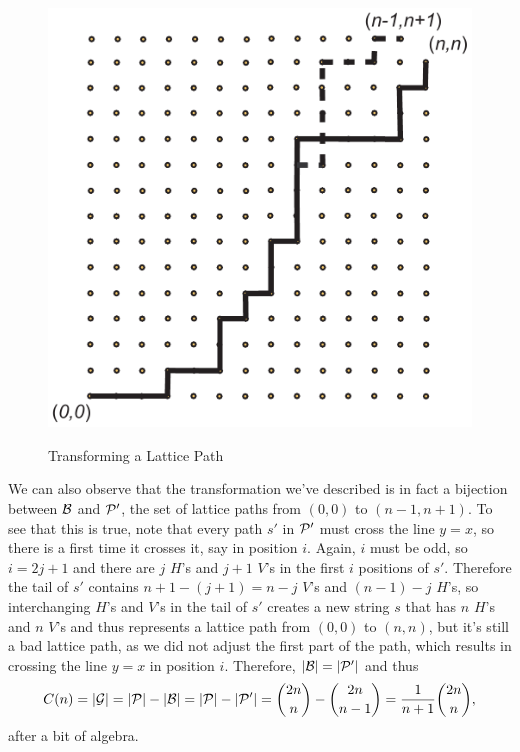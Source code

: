 \begin{example}
\begin{figure}
\begin{center}
\includegraphics[scale=.4]{string-figs/3012-fig26}\\
\caption{Transforming a Lattice Path}
\label{flippath}
\end{center}
\end{figure}

We can also observe that the transformation we've described is in fact
a bijection between $\mathcal{B}$ and $\mathcal{P}'$, the set of lattice paths from
$(0,0)$ to $(n-1,n+1)$. To see that this is true, note that every path
$s'$ in $\mathcal{P}'$ must cross the line $y=x$, so there is a first time it
crosses it, say in position $i$. Again, $i$ must be odd, so $i=2j+1$
and there are $j$ $H$'s and $j+1$ $V$'s in the first $i$ positions of
$s'$. Therefore the tail of $s'$ contains $n+1-(j+1)=n-j$ $V$'s and
$(n-1)-j$ $H$'s, so interchanging $H$'s and $V$'s in the tail of $s'$
creates a new string $s$ that has $n$ $H$'s and $n$ $V$'s and thus
represents a lattice path from $(0,0)$ to $(n,n)$, but it's still a
bad lattice path, as we did not adjust the first part of the path,
which results in crossing the line $y=x$ in position $i$. Therefore,
$|\mathcal{B}|=|\mathcal{P}'|$ and thus
\[C(n)=|\mathcal{G}|=|\mathcal{P}|-|\mathcal{B}|=|\mathcal{P}|-|\mathcal{P}'| = \binom{2n}{n} -
\binom{2n}{n-1} = \frac{1}{n+1}\binom{2n}{n},\]
after a bit of algebra.
\end{example}

